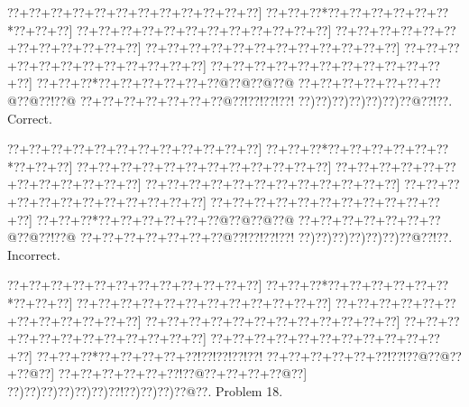 \documentclass[a5paper]{article}
\begin{document}
\begin{center}
{\goo
\0??+\0??+\0??+\0??+\0??+\0??+\0??+\0??+\0??+\0??+\0??+\0??]
\0??+\0??+\0??*\0??+\0??+\0??+\0??+\0??+\0??*\0??+\0??+\0??]
\0??+\0??+\0??+\0??+\0??+\0??+\0??+\0??+\0??+\0??+\0??+\0??]
\0??+\0??+\0??+\0??+\0??+\0??+\0??+\0??+\0??+\0??+\0??+\0??]
\0??+\0??+\0??+\0??+\0??+\0??+\0??+\0??+\0??+\0??+\0??+\0??]
\0??+\0??+\0??+\0??+\0??+\0??+\0??+\0??+\0??+\0??+\0??+\0??]
\0??+\0??+\0??+\0??+\0??+\0??+\0??+\0??+\0??+\0??+\0??+\0??]
\0??+\0??+\0??*\0??+\0??+\0??+\0??+\0??+\0??@\0??@\0??@\0??@
\0??+\0??+\0??+\0??+\0??+\0??+\0??@\0??@\0??!\0??@
\0??+\0??+\0??+\0??+\0??+\0??+\0??@\0??!\0??!\0??!\0??!
\0??)\0??)\0??)\0??)\0??)\0??)\0??@\0??!\0??.
}
Correct. 

\end{center}
\begin{center}
{\goo
\0??+\0??+\0??+\0??+\0??+\0??+\0??+\0??+\0??+\0??+\0??+\0??]
\0??+\0??+\0??*\0??+\0??+\0??+\0??+\0??+\0??*\0??+\0??+\0??]
\0??+\0??+\0??+\0??+\0??+\0??+\0??+\0??+\0??+\0??+\0??+\0??]
\0??+\0??+\0??+\0??+\0??+\0??+\0??+\0??+\0??+\0??+\0??+\0??]
\0??+\0??+\0??+\0??+\0??+\0??+\0??+\0??+\0??+\0??+\0??+\0??]
\0??+\0??+\0??+\0??+\0??+\0??+\0??+\0??+\0??+\0??+\0??+\0??]
\0??+\0??+\0??+\0??+\0??+\0??+\0??+\0??+\0??+\0??+\0??+\0??]
\0??+\0??+\0??*\0??+\0??+\0??+\0??+\0??+\0??@\0??@\0??@\0??@
\0??+\0??+\0??+\0??+\0??+\0??+\0??@\0??@\0??!\0??@
\0??+\0??+\0??+\0??+\0??+\0??+\0??@\0??!\0??!\0??!\0??!
\0??)\0??)\0??)\0??)\0??)\0??)\0??@\0??!\0??.
}
Incorrect. 

\end{center}
\newpage
\begin{center}
{\goo
\0??+\0??+\0??+\0??+\0??+\0??+\0??+\0??+\0??+\0??+\0??+\0??]
\0??+\0??+\0??*\0??+\0??+\0??+\0??+\0??+\0??*\0??+\0??+\0??]
\0??+\0??+\0??+\0??+\0??+\0??+\0??+\0??+\0??+\0??+\0??+\0??]
\0??+\0??+\0??+\0??+\0??+\0??+\0??+\0??+\0??+\0??+\0??+\0??]
\0??+\0??+\0??+\0??+\0??+\0??+\0??+\0??+\0??+\0??+\0??+\0??]
\0??+\0??+\0??+\0??+\0??+\0??+\0??+\0??+\0??+\0??+\0??+\0??]
\0??+\0??+\0??+\0??+\0??+\0??+\0??+\0??+\0??+\0??+\0??+\0??]
\0??+\0??+\0??*\0??+\0??+\0??+\0??+\0??!\0??!\0??!\0??!\0??!
\0??+\0??+\0??+\0??+\0??+\0??!\0??!\0??@\0??@\0??+\0??@\0??]
\0??+\0??+\0??+\0??+\0??+\0??!\0??@\0??+\0??+\0??+\0??@\0??]
\0??)\0??)\0??)\0??)\0??)\0??)\0??!\0??)\0??)\0??)\0??@\0??.
}
Problem 18.

\end{center}
\end{document}
